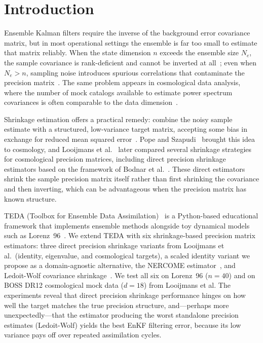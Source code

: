\section{Introduction}
\label{sec:introduction}

Ensemble Kalman filters require the inverse of the background error covariance matrix, but in most operational settings the ensemble is far too small to estimate that matrix reliably. When the state dimension $n$ exceeds the ensemble size $N_e$, the sample covariance is rank-deficient and cannot be inverted at all~\cite{houtekamer1998data}; even when $N_e > n$, sampling noise introduces spurious correlations that contaminate the precision matrix~\cite{anderson2001ensemble}. The same problem appears in cosmological data analysis, where the number of mock catalogs available to estimate power spectrum covariances is often comparable to the data dimension~\cite{hamilton2006measuring}.

Shrinkage estimation offers a practical remedy: combine the noisy sample estimate with a structured, low-variance target matrix, accepting some bias in exchange for reduced mean squared error~\cite{ledoit2004well}. Pope and Szapudi~\cite{pope2008shrinkage} brought this idea to cosmology, and Looijmans et al.~\cite{looijmans2024comparison} later compared several shrinkage strategies for cosmological precision matrices, including direct precision shrinkage estimators based on the framework of Bodnar et al.~\cite{bodnar2016direct}. These direct estimators shrink the sample precision matrix itself rather than first shrinking the covariance and then inverting, which can be advantageous when the precision matrix has known structure.

TEDA (Toolbox for Ensemble Data Assimilation)~\cite{nino2022teda} is a Python-based educational framework that implements ensemble methods alongside toy dynamical models such as Lorenz~96~\cite{lorenz1996predictability}. We extend TEDA with six shrinkage-based precision matrix estimators: three direct precision shrinkage variants from Looijmans et al.\ (identity, eigenvalue, and cosmological targets), a scaled identity variant we propose as a domain-agnostic alternative, the NERCOME estimator~\cite{joachimi2017non}, and Ledoit-Wolf covariance shrinkage~\cite{ledoit2004well}. We test all six on Lorenz~96 ($n = 40$) and on BOSS DR12 cosmological mock data ($d = 18$) from Looijmans et al. The experiments reveal that direct precision shrinkage performance hinges on how well the target matches the true precision structure, and---perhaps more unexpectedly---that the estimator producing the worst standalone precision estimates (Ledoit-Wolf) yields the best EnKF filtering error, because its low variance pays off over repeated assimilation cycles.
